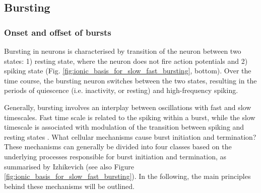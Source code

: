\documentclass[../main.tex]{subfiles}
\begin{document}

\subsection{Bursting}

\subsubsection{Onset and offset of bursts}

Bursting in neurons is characterised by transition of the neuron between two states: 1) resting state, where the neuron does not fire action potentials and 2) spiking state (Fig. \ref{fig:ionic_basis_for_slow_fast_bursting}, bottom). Over the time course, the bursting neuron switches between the two states, resulting in the periods of quiescence (i.e. inactivity, or resting) and high-frequency spiking.

Generally, bursting involves an interplay between oscillations with fast and slow timescales. Fast time scale is related to the spiking within a burst, while the slow timescale is associated with modulation of the transition between spiking and resting states \cite{izhikevichDynamicalSystemsNeuroscience2006}. What cellular mechanisms cause burst initiation and termination? These mechanisms can generally be divided into four classes based on the underlying processes responsible for burst initiation and termination, as summarised by Izhikevich \cite{izhikevichDynamicalSystemsNeuroscience2006} (see also Figure \ref{fig:ionic_basis_for_slow_fast_bursting}). In the following, the main principles behind these mechanisms will be outlined.
\end{document}
